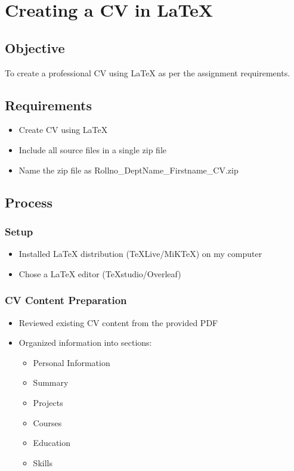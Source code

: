 \section{Creating a CV in LaTeX}

\subsection{Objective}
To create a professional CV using LaTeX as per the assignment requirements.

\subsection{Requirements}
\begin{itemize}
    \item Create CV using LaTeX
    \item Include all source files in a single zip file
    \item Name the zip file as Rollno\_DeptName\_Firstname\_CV.zip
\end{itemize}

\subsection{Process}

\subsubsection{Setup}
\begin{itemize}
    \item Installed LaTeX distribution (TeXLive/MiKTeX) on my computer
    \item Chose a LaTeX editor (TeXstudio/Overleaf)
\end{itemize}

\subsubsection{CV Content Preparation}
\begin{itemize}
    \item Reviewed existing CV content from the provided PDF
    \item Organized information into sections:
    \begin{itemize}
        \item Personal Information
        \item Summary
        \item Projects
        \item Courses
        \item Education
        \item Skills
    \end{itemize}
\end{itemize}

